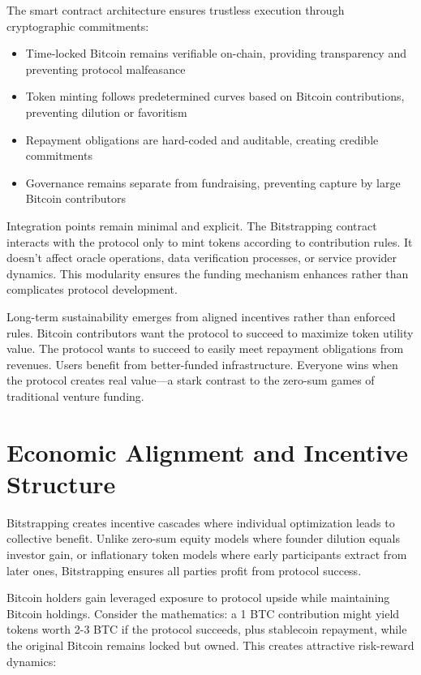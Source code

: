 The smart contract architecture ensures trustless execution through cryptographic commitments:

\begin{itemize}
\item Time-locked Bitcoin remains verifiable on-chain, providing transparency and preventing protocol malfeasance
\item Token minting follows predetermined curves based on Bitcoin contributions, preventing dilution or favoritism
\item Repayment obligations are hard-coded and auditable, creating credible commitments
\item Governance remains separate from fundraising, preventing capture by large Bitcoin contributors
\end{itemize}

Integration points remain minimal and explicit. The Bitstrapping contract interacts with the protocol only to mint tokens according to contribution rules. It doesn't affect oracle operations, data verification processes, or service provider dynamics. This modularity ensures the funding mechanism enhances rather than complicates protocol development.

Long-term sustainability emerges from aligned incentives rather than enforced rules. Bitcoin contributors want the protocol to succeed to maximize token utility value. The protocol wants to succeed to easily meet repayment obligations from revenues. Users benefit from better-funded infrastructure. Everyone wins when the protocol creates real value—a stark contrast to the zero-sum games of traditional venture funding.

\section{Economic Alignment and Incentive Structure}

Bitstrapping creates incentive cascades where individual optimization leads to collective benefit. Unlike zero-sum equity models where founder dilution equals investor gain, or inflationary token models where early participants extract from later ones, Bitstrapping ensures all parties profit from protocol success.

Bitcoin holders gain leveraged exposure to protocol upside while maintaining Bitcoin holdings. Consider the mathematics: a 1 BTC contribution might yield tokens worth 2-3 BTC if the protocol succeeds, plus stablecoin repayment, while the original Bitcoin remains locked but owned. This creates attractive risk-reward dynamics:

